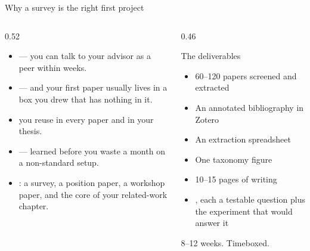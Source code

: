 \documentclass[aspectratio=169,11pt]{beamer}
\begin{document}
\begin{frame}{Why a survey is the right first project}
\begin{columns}[T]
\begin{column}{0.52\textwidth}
\begin{itemize}
  \item {} --- you can talk to your advisor as a peer within
        weeks.
  \item {} --- and your first paper usually lives in a box you
        drew that has nothing in it.
  \item {} you reuse in every paper and in your thesis.
  \item {} --- learned before you waste a
        month on a non-standard setup.
  \item {}: a survey, a position paper, a workshop paper, and
        the core of your related-work chapter.
\end{itemize}
\end{column}
\begin{column}{0.46\textwidth}
\begin{block}{The deliverables}
\footnotesize
\begin{itemize}
  \item 60--120 papers screened and extracted
  \item An annotated bibliography in Zotero
  \item An extraction spreadsheet
  \item One taxonomy figure
  \item 10--15 pages of writing
  \item {}, each a testable question plus the experiment that
        would answer it
\end{itemize}
\end{block}
\centering\footnotesize 8--12 weeks. Timeboxed.
\end{column}
\end{columns}
\end{frame}
\end{document}

